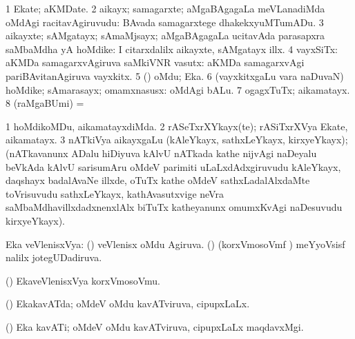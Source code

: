 {{\bentry
{} 
\gl{\nA}
\bmng
\bnum
\num{1} Ekate; aKMDate. 
\num{2} aikayx; samagarxte; aMgaBAgagaLa meVLanadiMda oMdAgi racitavAgiruvudu:  BAvada samagarxtege dhakekxyuMTumADu. 
\num{3} aikayxte; sAMgatayx; sAmaMjsayx; aMgaBAgagaLa ucitavAda parasapxra saMbaMdha yA hoMdike:  I citarxdalilx aikayxte, sAMgatayx illx. 
\num{4} vayxSiTx: aKMDa samagarxvAgiruva saMkiVNR vasutx:  aKMDa samagarxvAgi pariBAvitanAgiruva vayxkitx. 
\num{5} (\ga) oMdu; Eka. 
\num{6} (vayxkitxgaLu \mo vara naDuvaN) hoMdike; sAmarasayx; omamxnasusx:  oMdAgi bALu. 
\num{7} ogagxTuTx; aikamatayx. 
\num{8} (raMgaBUmi) =  
\enum
\emng

\noindent
\gl{\pagu}
\expl{}
\bmng
\bnum
\num{1}  hoMdikoMDu, aikamatayxdiMda. 
\num{2}  rASeTxrXYkayx(te); rASiTxrXVya Ekate, aikamatayx. 
\hypertarget{unity pagu(3)}{} 
\num{3}  nATkiVya aikayxgaLu (kAleYkayx, sathxLeYkayx, kirxyeYkayx); (nATkavanunx ADalu hiDiyuva kAlvU nATkada kathe nijvAgi naDeyalu beVkAda kAlvU sarisumAru oMdeV parimiti uLaLxdAdxgiruvudu kAleYkayx, daqshayx badalAvaNe illxde, oTuTx kathe oMdeV sathxLadalAlxdaMte toVrisuvudu sathxLeYkayx, kathAvasutxvige neVra saMbaMdhavillxdadxnenxlAlx biTuTx katheyanunx omumxKvAgi naDesuvudu kirxyeYkayx). 
\enum
\emng
\eentry

\bentry
{}
\gl{\saMkiSx}
\expl{}
\bmng
{} 
\emng
\eentry

\bentry
{} 
\gl{\gu}
\expl{}
\bmng
Eka veVlenisxVya: 
\banum
{} (\ravi) veVlenisx oMdu Agiruva. 
 (\jiVvi) (korxVmosoVmf \vi) meYyoVsisf  nalilx jotegUDadiruva. 
\eanum
\emng
\eentry

\bentry
{} 
\gl{\nA}
\expl{}
\bmng
(\jiVvi) EkaveVlenisxVya korxVmosoVmu. 
\emng
\eentry

\bentry
{} 
\gl{\gu}
\expl{}
\bmng
(\pArxvi) EkakavATda; oMdeV oMdu kavATviruva, cipupxLaLx. 
\emng
\eentry

\bentry
{} 
\gl{\nA}
\expl{}
\bmng
(\pArxvi) Eka kavATi; oMdeV oMdu kavATviruva, cipupxLaLx maqdavxMgi. 
\emng
\eentry

}}
